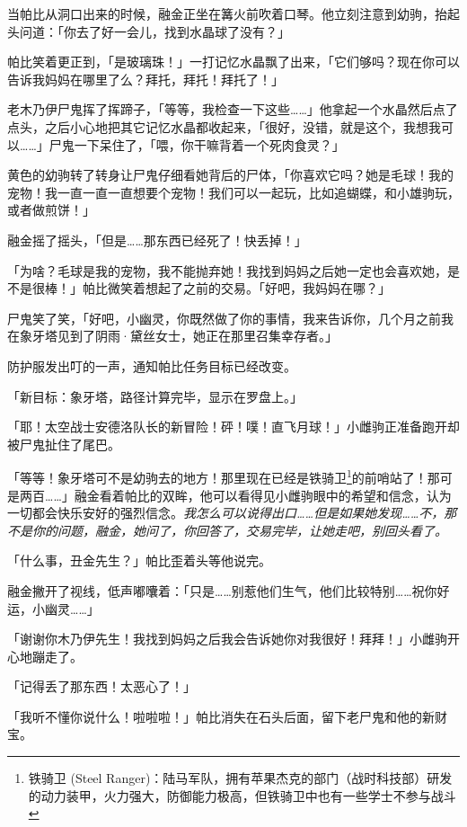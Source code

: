 
当帕比从洞口出来的时候，融金正坐在篝火前吹着口琴。他立刻注意到幼驹，抬起头问道：「你去了好一会儿，找到水晶球了没有？」

帕比笑着更正到，「是玻璃珠！」一打记忆水晶飘了出来，「它们够吗？现在你可以告诉我妈妈在哪里了么？拜托，拜托！拜托了！」

老木乃伊尸鬼挥了挥蹄子，「等等，我检查一下这些……」他拿起一个水晶然后点了点头，之后小心地把其它记忆水晶都收起来，「很好，没错，就是这个，我想我可以……」尸鬼一下呆住了，「喂，你干嘛背着一个死肉食灵？」

黄色的幼驹转了转身让尸鬼仔细看她背后的尸体，「你喜欢它吗？她是毛球！我的宠物！我一直一直一直想要个宠物！我们可以一起玩，比如追蝴蝶，和小雄驹玩，或者做煎饼！」

融金摇了摇头，「但是……那东西已经死了！快丢掉！」

「为啥？毛球是我的宠物，我不能抛弃她！我找到妈妈之后她一定也会喜欢她，是不是很棒！」帕比微笑着想起了之前的交易。「好吧，我妈妈在哪？」

尸鬼笑了笑，「好吧，小幽灵，你既然做了你的事情，我来告诉你，几个月之前我在象牙塔见到了阴雨·黛丝女士，她正在那里召集幸存者。」

防护服发出叮的一声，通知帕比任务目标已经改变。

「{\mt 新目标：象牙塔，路径计算完毕，显示在罗盘上。}」

「耶！太空战士安德洛队长的新冒险！砰！噗！直飞月球！」小雌驹正准备跑开却被尸鬼扯住了尾巴。

「等等！象牙塔可不是幼驹去的地方！那里现在已经是铁骑卫\footnote{铁骑卫 (Steel Ranger)：陆马军队，拥有苹果杰克的部门（战时科技部）研发的动力装甲，火力强大，防御能力极高，但铁骑卫中也有一些学士不参与战斗}的前哨站了！那可是两百……」融金看着帕比的双眸，他可以看得见小雌驹眼中的希望和信念，认为一切都会快乐安好的强烈信念。\emph{我怎么可以说得出口……但是如果她发现……不，那不是你的问题，融金，她问了，你回答了，交易完毕，让她走吧，别回头看了。}

「什么事，丑金先生？」帕比歪着头等他说完。

融金撇开了视线，低声嘟囔着：「只是……别惹他们生气，他们比较特别……祝你好运，小幽灵……」

「谢谢你木乃伊先生！我找到妈妈之后我会告诉她你对我很好！拜拜！」小雌驹开心地蹦走了。

「记得丢了那东西！太恶心了！」

「我听不懂你说什么！啦啦啦！」帕比消失在石头后面，留下老尸鬼和他的新财宝。

